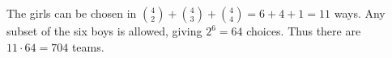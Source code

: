 The girls can be chosen in $\binom42+\binom43+\binom44=6+4+1=11$ ways. Any subset of the six boys is allowed, giving $2^6=64$ choices. Thus there are $11\cdot64=\boxed{704}$ teams.
